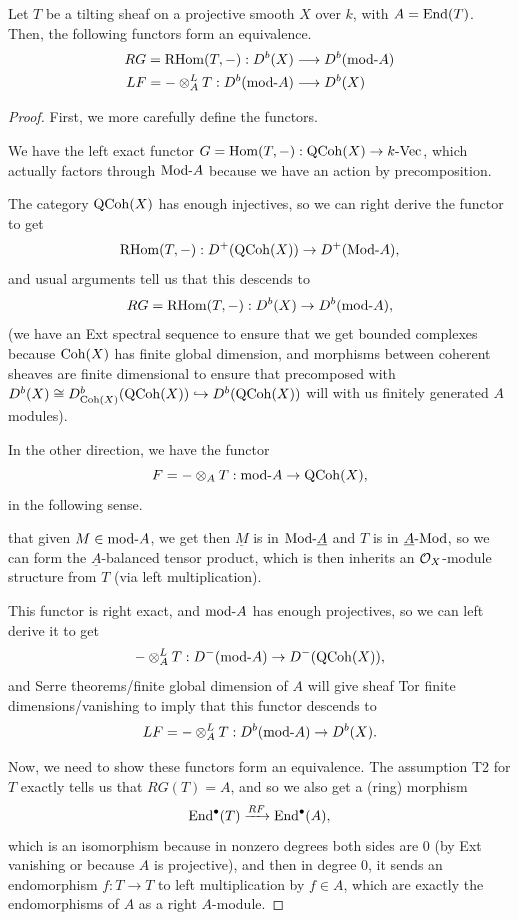 \documentclass[12pt]{article}
\begin{document}
\begin{thm}\label{tilting-quiver}
    Let $T$ be a tilting sheaf on a projective smooth $X$ over $k$, with $A=\operatorname{End}(T)$. Then, the following functors form an equivalence.
    \begin{align*}
        RG= \operatorname{RHom}(T,-): D^b(X) &\longrightarrow D^b(\mathrm{mod}\text{-} A)\\
        LF= - \otimes_A^L T: D^b(\mathrm{mod}\text{-} A) &\longrightarrow D^b(X)
    \end{align*}
\end{thm}
\begin{proof}
    First, we more carefully define the functors.
    
    We have the left exact functor $G=\mathrm{Hom}(T,-): \mathrm{QCoh}(X) \to k\text{-}\mathrm{Vec}$, which actually factors through $\mathrm{Mod}\text{-} A$ because we have an action by precomposition.
    
    The category $\mathrm{QCoh}(X)$ has enough injectives, so we can right derive the functor to get
    \[\operatorname{RHom}(T,-): D^+(\mathrm{QCoh}(X)) \to D^+(\mathrm{Mod}\text{-} A),\]
    and usual arguments tell us that this descends to
    \[RG = \operatorname{RHom}(T,-): D^b(X) \to D^b(\mathrm{mod}\text{-} A),\]
    (we have an Ext spectral sequence to ensure that we get bounded complexes because $\operatorname{Coh}(X)$ has finite global dimension, and morphisms between coherent sheaves are finite dimensional to ensure that precomposed with $D^b(X) \cong D^b_{\operatorname{Coh}(X)}(\mathrm{QCoh}(X)) \hookrightarrow D^b(\mathrm{QCoh}(X))$ will with us finitely generated $A$ modules).

    In the other direction, we have the functor
    \[F = - \otimes_A T: \mathrm{mod}\text{-} A \to \mathrm{QCoh}(X),\]
    in the following sense.
    
    
    that given $M \in \mathrm{mod}\text{-} A$, we get then $\underline{M}$ is in $\mathrm{Mod}\text{-} \underline{A}$ and $T$ is in $\underline{A} \text{-}\mathrm{Mod}$, so we can form the $\underline{A}$-balanced tensor product, which is then inherits an $\mathcal{O}_X$-module structure from $T$ (via left multiplication).

    This functor is right exact, and $\mathrm{mod}\text{-} A$ has enough projectives, so we can left derive it to get
    \[- \otimes_A^L T: D^-(\mathrm{mod}\text{-} A) \to D^-(\mathrm{QCoh}(X)),\]
    and Serre theorems/finite global dimension of $A$ will give sheaf Tor finite dimensions/vanishing to imply that this functor descends to
    \[LF = - \otimes_A^L T: D^b(\mathrm{mod}\text{-} A) \to D^b(X).\]

    Now, we need to show these functors form an equivalence. The assumption T2 for $T$ exactly tells us that $RG(T)=A$, and so we also get a (ring) morphism
    \[\operatorname{End}^\bullet(T) \xrightarrow{RF} \operatorname{End}^\bullet(A),\]
    which is an isomorphism because in nonzero degrees both sides are 0 (by Ext vanishing or because $A$ is projective), and then in degree 0, it sends an endomorphism $f:T\to T$ to left multiplication by $f\in A$, which are exactly the endomorphisms of $A$ as a right $A$-module.
    

\end{proof}
\end{document}
